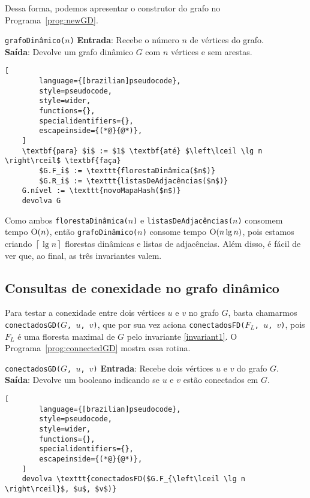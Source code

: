 Dessa forma, podemos apresentar o construtor do grafo no Programa~\ref{prog:newGD}. 

\begin{programruledcaption}{\texttt{grafoDinâmico($n$)} \label{prog:newGD}}
    \noindent\textbf{Entrada}: Recebe o número $n$ de vértices do grafo. \\
    \textbf{Saída}: Devolve um grafo dinâmico $G$ com $n$ vértices e sem arestas.
    \vspace{-0.5\baselineskip}
    \begin{lstlisting}[
        language={[brazilian]pseudocode},
        style=pseudocode,
        style=wider,
        functions={},
        specialidentifiers={},
        escapeinside={(*@}{@*)},
    ]
    \textbf{para} $i$ := $1$ \textbf{até} $\left\lceil \lg n \right\rceil$ \textbf{faça}
        $G.F_i$ := \texttt{florestaDinâmica($n$)}
        $G.R_i$ := \texttt{listasDeAdjacências($n$)}
    G.nível := \texttt{novoMapaHash($n$)}
    devolva G
    \end{lstlisting}
    \vspace{-0.5\baselineskip}
\end{programruledcaption}

Como ambos \texttt{florestaDinâmica($n$)} e \texttt{listasDeAdjacências($n$)} consomem tempo $\mathrm{O}(n)$, então \texttt{grafoDinâmico($n$)} consome tempo $\mathrm{O}(n \lg n)$, pois estamos criando $\left\lceil \lg n \right\rceil$ florestas dinâmicas e listas de adjacências. Além disso, é fácil de ver que, ao final, as três invariantes valem.

\subsection{Consultas de conexidade no grafo dinâmico}
\label{sec:dynamic-graph-connectivity-queries}

Para testar a conexidade entre dois vértices $u$ e $v$ no grafo $G$, basta chamarmos \texttt{conectadosGD($G$, $u$, $v$)}, que por sua vez aciona \texttt{conectadosFD($F_L$, $u$, $v$)}, pois $F_L$ é uma floresta maximal de $G$ pelo invariante \ref{invariant1}. O Programa~\ref{prog:connectedGD} mostra essa rotina.

\begin{programruledcaption}{\texttt{conectadosGD($G$, $u$, $v$)} \label{prog:connectedGD}}
    \noindent\textbf{Entrada}: Recebe dois vértices $u$ e $v$ do grafo $G$. \\
    \textbf{Saída}: Devolve um booleano indicando se $u$ e $v$ estão conectados em $G$.
    \vspace{-0.5\baselineskip}
    \begin{lstlisting}[
        language={[brazilian]pseudocode},
        style=pseudocode,
        style=wider,
        functions={},
        specialidentifiers={},
        escapeinside={(*@}{@*)},
    ]
    devolva \texttt{conectadosFD($G.F_{\left\lceil \lg n \right\rceil}$, $u$, $v$)}
    \end{lstlisting}
    \vspace{-0.5\baselineskip}
\end{programruledcaption}


